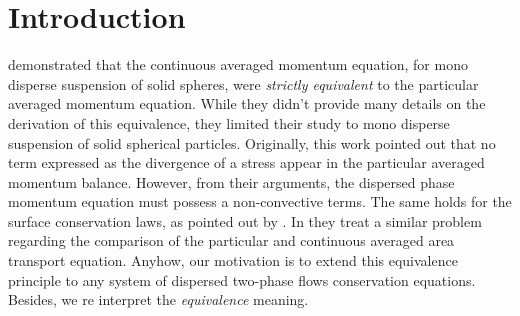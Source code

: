 \section{Introduction}


\citet{nott2011suspension} demonstrated that the continuous averaged momentum equation, for mono disperse suspension of solid spheres, were \textit{strictly equivalent} to the particular averaged momentum equation.
While they didn't provide many details on the derivation of this equivalence, they limited their study to mono disperse suspension of solid spherical particles.
Originally, this work pointed out that no term expressed as the divergence of a stress appear in the particular averaged momentum balance.
However, from their arguments, the dispersed phase momentum equation must possess a non-convective terms.
The same holds for the surface conservation laws, as pointed out by \citet{lhuillier2000bilan}.
In \citet{lhuillier2000bilan} they treat a similar problem regarding the comparison of the particular and continuous averaged area transport equation. 
Anyhow, our motivation is to extend this equivalence principle to any system of dispersed two-phase flows conservation equations.
Besides, we re interpret the \textit{equivalence} meaning. 